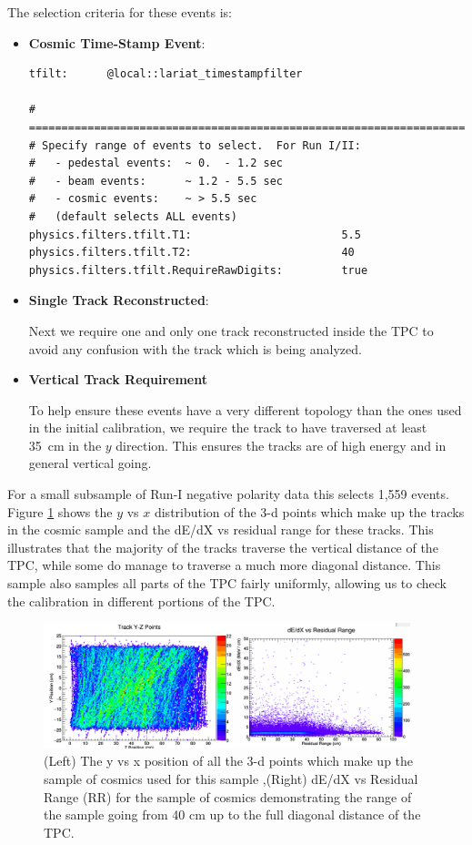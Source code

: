 The selection criteria for these events is: 

\begin{itemize}
\item \textbf{Cosmic Time-Stamp Event}:

\begin{verbatim}
tfilt:      @local::lariat_timestampfilter

# ====================================================================
# Specify range of events to select.  For Run I/II:
#   - pedestal events:  ~ 0.  - 1.2 sec
#   - beam events:      ~ 1.2 - 5.5 sec
#   - cosmic events:    ~ > 5.5 sec
#   (default selects ALL events)
physics.filters.tfilt.T1:                       5.5
physics.filters.tfilt.T2:                       40
physics.filters.tfilt.RequireRawDigits:         true

\end{verbatim}

\item \textbf{Single Track Reconstructed}:

Next we require one and only one track reconstructed inside the TPC to avoid any confusion with the track which is being analyzed.

\item \textbf{Vertical Track Requirement}

To help ensure these events have a very different topology than the ones used in the initial calibration, we require the track to have traversed at least 35~cm in the $y$ direction. This ensures the tracks are of high energy and in general vertical going.

\end{itemize}

For a small subsample of Run-I negative polarity data this selects 1,559 events. Figure \ref{fig:CosmicDist} shows the $y$ vs $x$ distribution of the 3-d points which make up the tracks in the cosmic sample and the dE/dX vs residual range for these tracks. This illustrates that the majority of the tracks traverse the vertical distance of the TPC, while some do manage to traverse a much more diagonal distance. This sample also samples all parts of the TPC fairly uniformly, allowing us to check the calibration in different portions of the TPC.

\begin{figure}[htb]
\centering
\includegraphics[width=0.95\textwidth]{images/CosmicDist.png}
\caption{(Left) The y vs x position of all the 3-d points which make up the sample of cosmics used for this sample ,(Right) dE/dX vs Residual Range (RR) for the sample of cosmics demonstrating the range of the sample going from 40 cm up to the full diagonal distance of the TPC.}
\label{fig:CosmicDist}
\end{figure}


